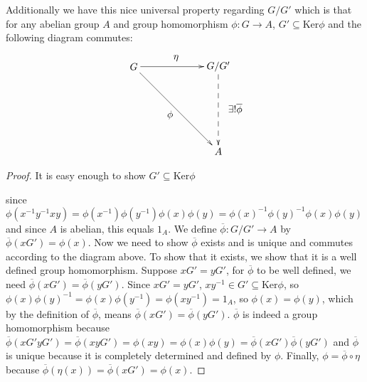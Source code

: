 \documentclass[11pt]{article}
\theoremstyle{definition}
\theoremstyle{plain}
\theoremstyle{plain}
\theoremstyle{plain}
\begin{document}
Additionally we have this nice universal property regarding $G/G'$ which is that for any abelian group $A$ and group homomorphism $\phi : G \to A$, $G' \subseteq \text{Ker}\phi$ and the following diagram commutes:

\begin{equation*}
\begin{xy}
(0,0)*+{G}="G"; (30,0)*+{G/G'}="gprime"; (30,-30)*+{A}="A";
{\ar "G";"gprime"}?*!/_3mm/{\eta};
{\ar "G";"A"}?*!/^3mm/{\phi};
{\ar@{-->} "gprime";"A"}?*!/_6mm/{\exists ! \overline{\phi}}
\end{xy}
\end{equation*}

\begin{proof}
It is easy enough to show $G' \subseteq \text{Ker}\phi$ 

since $\phi(x^{-1}y^{-1}xy)=\phi(x^{-1})\phi(y^{-1})\phi(x)\phi(y)=\phi(x)^{-1}\phi(y)^{-1}\phi(x)\phi(y)$ and since $A$ is abelian, this equals $1_{A}$. We define $\overline{\phi} : G/G' \to A$ by $\overline{\phi}(xG')=\phi(x)$. Now we need to show $\overline{\phi}$ exists and is unique and commutes according to the diagram above. To show that it exists, we show that it is a well defined group homomorphism. Suppose $xG'=yG'$, for $\overline{\phi}$ to be well defined, we need $\overline{\phi}(xG')=\overline{\phi}(yG')$. Since $xG'=yG'$, $xy^{-1} \in G' \subseteq \text{Ker}\phi$, so $\phi(x)\phi(y)^{-1}=\phi(x)\phi(y^{-1})=\phi(xy^{-1})=1_{A}$, so $\phi(x)=\phi(y)$, which by the definition of $\overline{\phi}$, means $\overline{\phi}(xG')=\overline{\phi}(yG')$. $\overline{\phi}$ is indeed a group homomorphism because $\overline{\phi}(xG'yG')=\overline{\phi}(xyG')=\phi(xy)=\phi(x)\phi(y)=\overline{\phi}(xG')\overline{\phi}(yG')$ and $\overline{\phi}$ is unique because it is completely determined and defined by $\phi$. Finally, $\phi = \overline{\phi} \circ \eta$ because $\overline{\phi}(\eta(x))=\overline{\phi}(xG')=\phi(x)$.
\end{proof}

\nocite{*}


\end{document}
